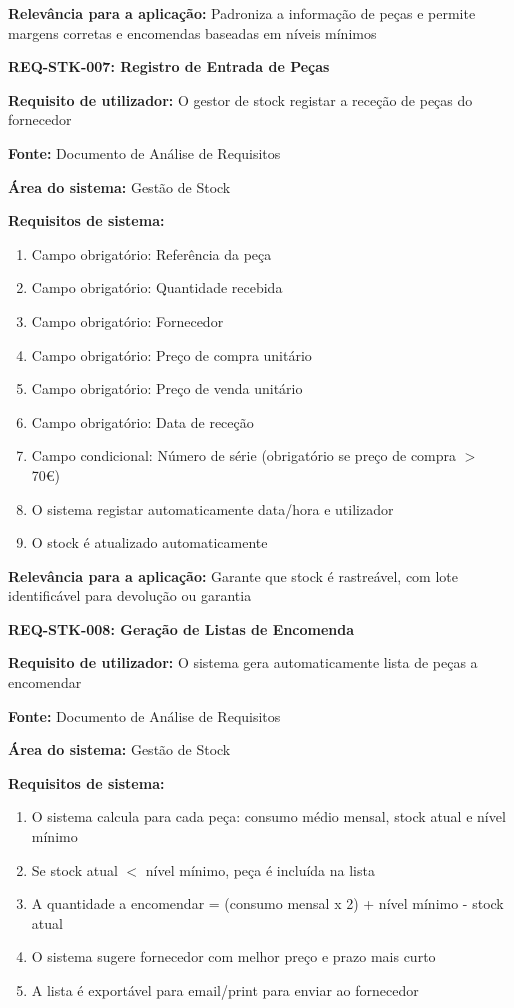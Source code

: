 \documentclass[11pt,a4paper]{article}
\newcommand{\reqheader}[1]{{\noindent\large\bfseries\color{sectionblue}#1}\par\vspace{0.3cm}}
\newcommand{\reqfield}[2]{{\noindent\textbf{#1:} #2}\par\vspace{0.2cm}}
\begin{document}
\reqfield{Relevância para a aplicação}{Padroniza a informação de peças e permite margens corretas e encomendas baseadas em níveis mínimos}

\vspace{0.8cm}

\reqheader{REQ-STK-007: Registro de Entrada de Peças}

\reqfield{Requisito de utilizador}{O gestor de stock registar a receção de peças do fornecedor}

\reqfield{Fonte}{Documento de Análise de Requisitos}

\reqfield{Área do sistema}{Gestão de Stock}

\reqfield{Requisitos de sistema}{
	\begin{enumerate}
		\item Campo obrigatório: Referência da peça
		\item Campo obrigatório: Quantidade recebida
		\item Campo obrigatório: Fornecedor
		\item Campo obrigatório: Preço de compra unitário
		\item Campo obrigatório: Preço de venda unitário
		\item Campo obrigatório: Data de receção
		\item Campo condicional: Número de série (obrigatório se preço de compra $>$ 70€)
		\item O sistema registar automaticamente data/hora e utilizador
		\item O stock é atualizado automaticamente
	\end{enumerate}
}

\reqfield{Relevância para a aplicação}{Garante que stock é rastreável, com lote identificável para devolução ou garantia}

\vspace{0.8cm}

\reqheader{REQ-STK-008: Geração de Listas de Encomenda}

\reqfield{Requisito de utilizador}{O sistema gera automaticamente lista de peças a encomendar}

\reqfield{Fonte}{Documento de Análise de Requisitos}

\reqfield{Área do sistema}{Gestão de Stock}

\reqfield{Requisitos de sistema}{
	\begin{enumerate}
		\item O sistema calcula para cada peça: consumo médio mensal, stock atual e nível mínimo
		\item Se stock atual $<$ nível mínimo, peça é incluída na lista
		\item A quantidade a encomendar = (consumo mensal x 2) + nível mínimo - stock atual
		\item O sistema sugere fornecedor com melhor preço e prazo mais curto
		\item A lista é exportável para email/print para enviar ao fornecedor
	\end{enumerate}
}
\end{document}
